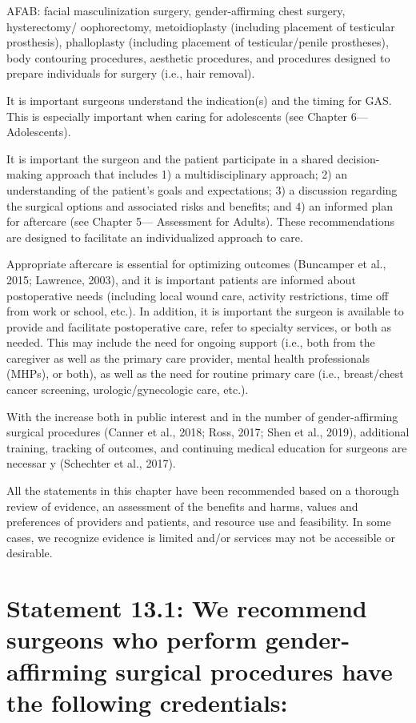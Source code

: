\documentclass[
]{book}
\begin{document}
AFAB: facial masculinization surgery,
gender-affirming chest surgery, hysterectomy/
oophorectomy, metoidioplasty (including placement of testicular prosthesis), phalloplasty
(including placement of testicular/penile prostheses), body contouring procedures, aesthetic procedures, and procedures designed to prepare
individuals for surgery (i.e., hair removal).

It is important surgeons understand the indication(s) and the timing for GAS. This is especially important when caring for adolescents (see
Chapter 6---Adolescents).

It is important the surgeon and the patient participate in a shared decision-making approach that
includes 1) a multidisciplinary approach; 2) an
understanding of the patient's goals and
expectations; 3) a discussion regarding the surgical
options and associated risks and benefits; and 4)
an informed plan for aftercare (see Chapter 5---
Assessment for Adults). These recommendations are
designed to facilitate an individualized approach
to care.

Appropriate aftercare is essential for optimizing
outcomes (Buncamper et al., 2015; Lawrence,
2003), and it is important patients are informed
about postoperative needs (including local wound
care, activity restrictions, time off from work or
school, etc.). In addition, it is important the surgeon is available to provide and facilitate postoperative care, refer to specialty services, or both
as needed. This may include the need for ongoing
support (i.e., both from the caregiver as well as
the primary care provider, mental health professionals (MHPs), or both), as well as the need for
routine primary care (i.e., breast/chest cancer
screening, urologic/gynecologic care, etc.).

With the increase both in public interest and
in the number of gender-affirming surgical procedures (Canner et al., 2018; Ross, 2017; Shen
et al., 2019), additional training, tracking of
outcomes, and continuing medical education
for surgeons are necessar y (Schechter
et al., 2017).

All the statements in this chapter have been
recommended based on a thorough review of
evidence, an assessment of the benefits and
harms, values and preferences of providers and
patients, and resource use and feasibility. In some
cases, we recognize evidence is limited and/or
services may not be accessible or desirable.

\hypertarget{statement-13.1-we-recommend-surgeons-who-perform-gender-affirming-surgical-procedures-have-the-following-credentials}{%
\section*{Statement 13.1: We recommend surgeons who perform gender-affirming surgical procedures have the following credentials:}\label{statement-13.1-we-recommend-surgeons-who-perform-gender-affirming-surgical-procedures-have-the-following-credentials}}
\end{document}
